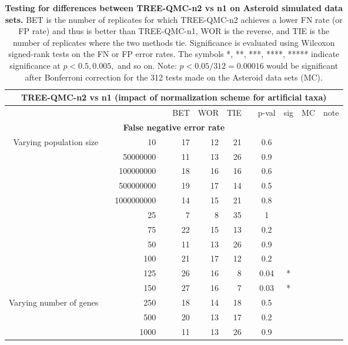 \begin{table}[!h]
\caption[Statistical testing for TREE-QMC-n2 vs n1 on Asteroid data]{
\textbf{Testing for differences between TREE-QMC-n2 vs n1 on Asteroid simulated data sets.}
BET is the number of replicates for which TREE-QMC-n2 achieves a lower FN rate (or FP rate) and thus is better than TREE-QMC-n1, WOR is the reverse, and TIE is the number of replicates where the two methods tie.
Significance is evaluated using Wilcoxon signed-rank tests on the FN or FP error rates.
The symbols *, **, ***, ****, ***** indicate significance at $p < 0.5, 0.005,$ and so on.
Note: $p < 0.05 / 312 = 0.00016$ would be significant after Bonferroni correction for the 312 tests made on the Asteroid data sets (MC).}
\centering
\scriptsize
\begin{tabular}{r r r l r r r l c c c l}
\toprule 
\multicolumn{12}{c}{\textbf{TREE-QMC-n2 vs n1 (impact of normalization scheme for artificial taxa)}} \\
\midrule
\multirow{ 1}{2cm}{}
& & & & BET & WOR & TIE & & p-val & sig & MC & note \\
\midrule
\multicolumn{12}{c}{\textbf{False negative error rate}} \\
\midrule
\multirow{ 6}{2cm}{Varying population size}
 & & 10 & & 17 & 12 & 21 & & 0.6 &  &  &  \\
   & & 50000000 & & 11 & 13 & 26 & & 0.9 &  &  &  \\
   & & 100000000 & & 18 & 16 & 16 & & 0.6 &  &  &  \\
   & & 500000000 & & 19 & 17 & 14 & & 0.5 &  &  &  \\
   & & 1000000000 & & 14 & 15 & 21 & & 0.8 &  &  &  \\
\midrule
\multirow{ 6}{2cm}{Varying number of taxa}
   & & 25 & & 7 & 8 & 35 & & 1 &  &  &  \\
   & & 75 & & 22 & 15 & 13 & & 0.2 &  &  &  \\
   & & 50 & & 11 & 13 & 26 & & 0.9 &  &  &  \\
   & & 100 & & 21 & 17 & 12 & & 0.2 &  &  &  \\
   & & 125 & & 26 & 16 & 8 & & 0.04 & * &  &  \\
   & & 150 & & 27 & 16 & 7 & & 0.03 & * &  &  \\
\midrule
\multirow{ 4}{2cm}{Varying number of genes}
   & & 250 & & 18 & 14 & 18 & & 0.5 &  &  &  \\
   & & 500 & & 20 & 13 & 17 & & 0.2 &  &  &  \\
   & & 1000 & & 11 & 13 & 26 & & 0.9 &  &  &  \\

\end{tabular}
\end{table}
